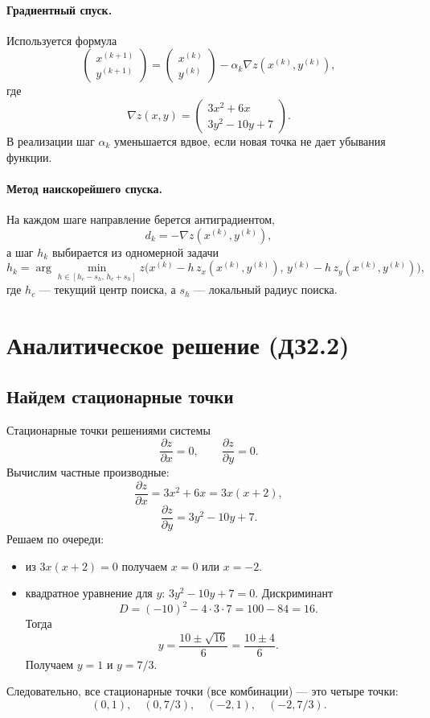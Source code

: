 \documentclass[12pt,a4paper]{article}
\begin{document}
\paragraph{Градиентный спуск.}
Используется формула
\[
\begin{pmatrix}
x^{(k+1)}\\
y^{(k+1)}
\end{pmatrix}
=
\begin{pmatrix}
x^{(k)}\\
y^{(k)}
\end{pmatrix}
-\alpha_k
\nabla z(x^{(k)},y^{(k)}),
\]
где
\[
\nabla z(x,y)=
\begin{pmatrix}
3x^2+6x\\
3y^2-10y+7
\end{pmatrix}.
\]
В реализации шаг $\alpha_k$ уменьшается вдвое, если новая точка не дает убывания функции.

\paragraph{Метод наискорейшего спуска.}
На каждом шаге направление берется антиградиентом,
\[
d_k=-\nabla z(x^{(k)},y^{(k)}),
\]
а шаг $h_k$ выбирается из одномерной задачи
\[
h_k=\arg\min_{h\in[h_c-s_h,\,h_c+s_h]} z\bigl(x^{(k)}-h\,z_x(x^{(k)},y^{(k)}),\,y^{(k)}-h\,z_y(x^{(k)},y^{(k)})\bigr),
\]
где $h_c$ — текущий центр поиска, а $s_h$ — локальный радиус поиска.

\section{Аналитическое решение (ДЗ2.2)}
\subsection{Найдем стационарные точки}
Стационарные точки решениями системы
\[
\frac{\partial z}{\partial x}=0,\qquad \frac{\partial z}{\partial y}=0.
\]
Вычислим частные производные:
\[
\frac{\partial z}{\partial x}=3x^{2}+6x=3x(x+2),
\]
\[
\frac{\partial z}{\partial y}=3y^{2}-10y+7.
\]
Решаем по очереди:
\begin{itemize}
  \item из $3x(x+2)=0$ получаем $x=0$ или $x=-2$.
  \item квадратное уравнение для $y$: $3y^{2}-10y+7=0$. Дискриминант
  \[D=(-10)^{2}-4\cdot3\cdot7=100-84=16.
  \]
  Тогда
  \[y=\frac{10\pm\sqrt{16}}{6}=\frac{10\pm4}{6}.
  \]
  Получаем $y=1$ и $y=7/3$.
\end{itemize}
Следовательно, все стационарные точки (все комбинации) — это четыре точки:
\[
(0,1),\quad (0,7/3),\quad (-2,1),\quad (-2,7/3).
\]
\end{document}
